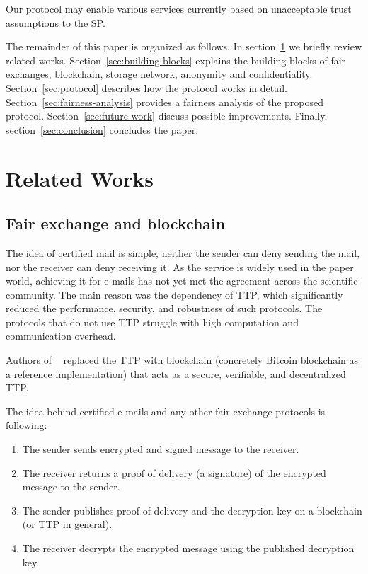 \documentclass{ieeeaccess}
\begin{document}
Our protocol may enable various services currently based on unacceptable trust assumptions to the SP.

The remainder of this paper is organized as follows.
In section~\ref{sec:related-works} we briefly review related works. 
Section~\ref{sec:building-blocks} explains the building blocks of fair exchanges, blockchain, storage network, anonymity and confidentiality.
Section~\ref{sec:protocol} describes how the protocol works in detail.
Section~\ref{sec:fairness-analysis} provides a fairness analysis of the proposed protocol.
Section~\ref{sec:future-work} discuss possible improvements. 
Finally, section~\ref{sec:conclusion} concludes the paper.


\section{Related Works}\label{sec:related-works}

\subsection{Fair exchange and blockchain}
The idea of certified mail is simple, neither the sender can deny sending the mail, nor the receiver can deny receiving it. As the service is widely used in the paper world, achieving it for e-mails has not yet met the agreement across the scientific community. The main reason was the dependency of TTP, which significantly reduced the performance, security, and robustness of such protocols. The protocols that do not use TTP struggle with high computation and communication overhead.

Authors of ~\cite{hinarejosSolutionSecureCertified2019} replaced the TTP with blockchain (concretely Bitcoin blockchain as a reference implementation) that acts as a secure, verifiable, and decentralized TTP.

The idea behind certified e-mails and any other fair exchange protocols is following:
\begin{enumerate}
    \item The sender sends encrypted and signed message to the receiver.
    \item The receiver returns a proof of delivery (a signature) of the encrypted message to the sender.
    \item The sender publishes proof of delivery and the decryption key on a blockchain (or TTP in general).
    \item The receiver decrypts the encrypted message using the published decryption key.
\end{enumerate}
\end{document}

